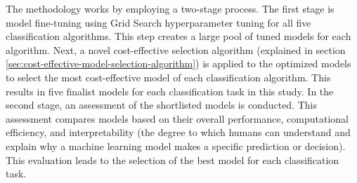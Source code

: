 The methodology works by employing a two-stage process. The first stage is model fine-tuning using Grid Search hyperparameter tuning for all five classification algorithms. This step creates a large pool of tuned models for each algorithm. Next, a novel cost-effective selection algorithm (explained in section \ref{sec:cost-effective-model-selection-algorithm}) is applied to the optimized models to select the most cost-effective model of each classification algorithm. This results in five finalist models for each classification task in this study. In the second stage, an assessment of the shortlisted models is conducted. This assessment compares models based on their overall performance, computational efficiency, and interpretability (the degree to which humans can understand and explain why a machine learning model makes a specific prediction or decision). This evaluation leads to the selection of the best model for each classification task.

